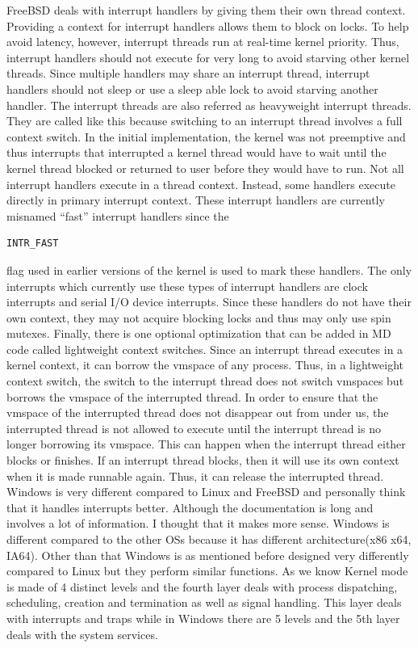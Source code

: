 \documentclass[letterpaper,10pt,draftclsnofoot,onecolumn]{IEEEtran}
\begin{document}
FreeBSD deals with interrupt handlers by giving them their own thread context. Providing a context for interrupt handlers allows them to block on locks. To help avoid latency, however, interrupt threads run at real-time kernel priority. Thus, interrupt handlers should not execute for very long to avoid starving other kernel threads. Since multiple handlers may share an interrupt thread, interrupt handlers should not sleep or use a sleep able lock to avoid starving another handler.
The interrupt threads are also referred as heavyweight interrupt threads. They are called like this because switching to an interrupt thread involves a full context switch. In the initial implementation, the kernel was not preemptive and thus interrupts that interrupted a kernel thread would have to wait until the kernel thread blocked or returned to user before they would have to run. Not all interrupt handlers execute in a thread context. Instead, some handlers execute directly in primary interrupt context. These interrupt handlers are currently misnamed “fast” interrupt handlers since the \begin{verbatim}INTR_FAST\end{verbatim} flag used in earlier versions of the kernel is used to mark these handlers. The only interrupts which currently use these types of interrupt handlers are clock interrupts and serial I/O device interrupts. Since these handlers do not have their own context, they may not acquire blocking locks and thus may only use spin mutexes.\cite{[2]}
Finally, there is one optional optimization that can be added in MD code called lightweight context switches. Since an interrupt thread executes in a kernel context, it can borrow the vmspace of any process. Thus, in a lightweight context switch, the switch to the interrupt thread does not switch vmspaces but borrows the vmspace of the interrupted thread. In order to ensure that the vmspace of the interrupted thread does not disappear out from under us, the interrupted thread is not allowed to execute until the interrupt thread is no longer borrowing its vmspace. This can happen when the interrupt thread either blocks or finishes. If an interrupt thread blocks, then it will use its own context when it is made runnable again. Thus, it can release the interrupted thread.
Windows is very different compared to Linux and FreeBSD and personally think that it handles interrupts better. Although the documentation is long and involves a lot of information. I thought that it makes more sense. Windows is different compared to the other OSs because it has different architecture(x86 x64, IA64). Other than that Windows is as mentioned before designed very differently compared to Linux but they perform similar functions. As we know Kernel mode is made of 4 distinct levels and the fourth layer deals with process dispatching, scheduling, creation and termination as well as signal handling. This layer deals with interrupts and traps while in Windows there are 5 levels and the 5th layer deals with the system services.
\end{document}
